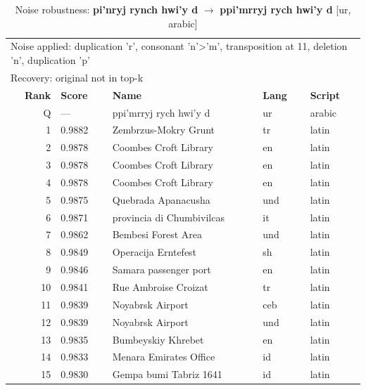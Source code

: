 \begin{table}[htbp]
\centering
\small
\caption{Noise robustness: \textbf{pi'nryj rynch hwi'y d} $\rightarrow$ \textbf{ppi'mrryj rych hwi'y d} [ur, arabic]}
\label{tab:noise-31}
\begin{tabular}{rllll}
\toprule
\multicolumn{5}{l}{\small Noise applied: duplication 'r', consonant 'n'>'m', transposition at 11, deletion 'n', duplication 'p'} \\
\multicolumn{5}{l}{\small Recovery: original not in top-k} \\
\midrule
\textbf{Rank} & \textbf{Score} & \textbf{Name} & \textbf{Lang} & \textbf{Script} \\
\midrule
\rowcolor{gray!20} Q & --- & ppi'mrryj rych hwi'y d & ur & arabic \\
\midrule
1 & 0.9882 & Zembrzus-Mokry Grunt & tr & latin \\
2 & 0.9878 & Coombes Croft Library & en & latin \\
3 & 0.9878 & Coombes Croft Library & en & latin \\
4 & 0.9878 & Coombes Croft Library & en & latin \\
5 & 0.9875 & Quebrada Apanacusha & und & latin \\
6 & 0.9871 & provincia di Chumbivilcas & it & latin \\
7 & 0.9862 & Bembesi Forest Area & und & latin \\
8 & 0.9849 & Operacija Erntefest & sh & latin \\
9 & 0.9846 & Samara passenger port & en & latin \\
10 & 0.9841 & Rue Ambroise Croizat & tr & latin \\
11 & 0.9839 & Noyabrsk Airport & ceb & latin \\
12 & 0.9839 & Noyabrsk Airport & und & latin \\
13 & 0.9835 & Bumbeyskiy Khrebet & en & latin \\
14 & 0.9833 & Menara Emirates Office & id & latin \\
15 & 0.9830 & Gempa bumi Tabriz 1641 & id & latin \\
\bottomrule
\end{tabular}
\end{table}

